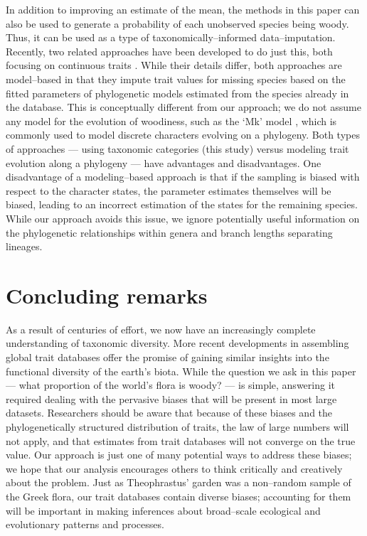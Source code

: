 \documentclass[a4paper,12pt]{article}
\begin{document}
In addition to improving an estimate of the mean, the methods in this
paper can also be used to generate a probability of each unobserved
species being woody.  Thus, it can be used as a type of taxonomically--informed 
data--imputation.  Recently, two related approaches have
been developed to do just this, both focusing on continuous traits
\citep{Swenson2013, PEM}.  While their details differ, both approaches
are model--based in that they impute trait values for missing species
based on the fitted parameters of phylogenetic models estimated from
the species already in the database. This is conceptually different
from our approach; we do not assume any model for the evolution of
woodiness, such as the `Mk' model \citep{Pagel1994}, which is commonly
used to model discrete characters evolving on a phylogeny. Both types
of approaches --- using taxonomic categories (this study) versus
modeling trait evolution along a phylogeny --- have advantages and
disadvantages.  One disadvantage of a modeling--based approach is that
if the sampling is biased with respect to the character states, the
parameter estimates themselves will be biased, leading to an incorrect
estimation of the states for the remaining species. While our approach
avoids this issue, we ignore potentially useful information on the
phylogenetic relationships within genera and branch lengths separating
lineages.

\section{Concluding remarks}

As a result of centuries of effort, we now have an increasingly
complete understanding of taxonomic diversity.  More recent
developments in assembling global trait databases offer the promise of
gaining similar insights into the functional diversity of the earth's
biota.
%
While the question we ask in this paper --- what proportion of the
world's flora is woody? --- is simple, answering it required dealing
with the pervasive biases that will be present in most large datasets.
%
Researchers should be aware that because of these biases and the
phylogenetically structured distribution of traits, the law of large
numbers will not apply, and that estimates from trait databases will
not converge on the true value.
%
Our approach is just one of many potential ways to address these
biases; we hope that our analysis encourages others to think
critically and creatively about the problem.
%
Just as Theophrastus' garden was a non--random sample of the Greek
flora, our trait databases contain diverse biases; accounting for them
will be important in making inferences about broad--scale ecological
and evolutionary patterns and processes.
\end{document}
